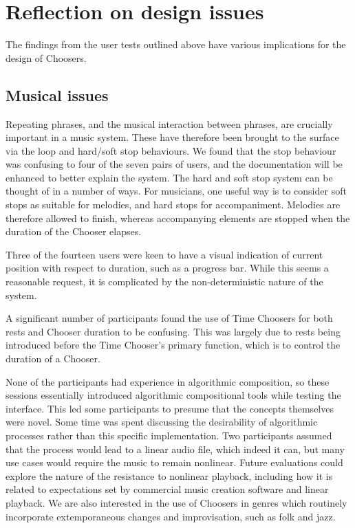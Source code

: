 \documentclass{ppig}
\begin{document}
\hypertarget{sec:reflection}{%
\section{Reflection on design issues}\label{sec:reflection}}

The findings from the user tests outlined above have various
implications for the design of Choosers.

\hypertarget{sec:musical}{%
\subsection{Musical issues}\label{sec:musical}}

Repeating phrases, and the musical interaction between phrases, are
crucially important in a music system. These have therefore been brought
to the surface via the loop and hard/soft stop behaviours. We found that
the stop behaviour was confusing to four of the seven pairs of users,
and the documentation will be enhanced to better explain the system. The
hard and soft stop system can be thought of in a number of ways. For
musicians, one useful way is to consider soft stops as suitable for
melodies, and hard stops for accompaniment. Melodies are therefore
allowed to finish, whereas accompanying elements are stopped when the
duration of the Chooser elapses.

Three of the fourteen users were keen to have a visual indication of
current position with respect to duration, such as a progress bar. While
this seems a reasonable request, it is complicated by the
non-deterministic nature of the system.

A significant number of participants found the use of Time Choosers for
both rests and Chooser duration to be confusing. This was largely due to
rests being introduced before the Time Chooser's primary function, which
is to control the duration of a Chooser.

None of the participants had experience in algorithmic composition, so
these sessions essentially introduced algorithmic compositional tools
while testing the interface. This led some participants to presume that
the concepts themselves were novel. Some time was spent discussing the
desirability of algorithmic processes rather than this specific
implementation. Two participants assumed that the process would lead to
a linear audio file, which indeed it can, but many use cases would
require the music to remain nonlinear. Future evaluations could explore
the nature of the resistance to nonlinear playback, including how it is
related to expectations set by commercial music creation software and
linear playback. We are also interested in the use of Choosers in genres
which routinely incorporate extemporaneous changes and improvisation,
such as folk and jazz.
\end{document}
